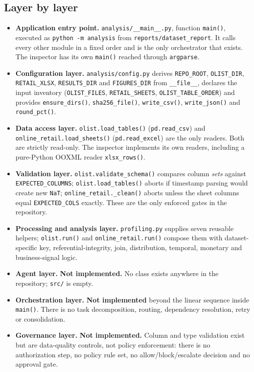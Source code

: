 \documentclass[11pt,a4paper]{article}
\newcommand{\code}[1]{\texttt{#1}}
\begin{document}
\subsection{Layer by layer}
\begin{itemize}
\item \textbf{Application entry point.} \code{analysis/\_\_main\_\_.py}, function \code{main()}, executed as \code{python -m analysis} from \code{reports/dataset\_report}. It calls every other module in a fixed order and is the only orchestrator that exists. The inspector has its own \code{main()} reached through \code{argparse}.
\item \textbf{Configuration layer.} \code{analysis/config.py} derives \code{REPO\_ROOT}, \code{OLIST\_DIR}, \code{RETAIL\_XLSX}, \code{RESULTS\_DIR} and \code{FIGURES\_DIR} from \code{\_\_file\_\_}, declares the input inventory (\code{OLIST\_FILES}, \code{RETAIL\_SHEETS}, \code{OLIST\_TABLE\_ORDER}) and provides \code{ensure\_dirs()}, \code{sha256\_file()}, \code{write\_csv()}, \code{write\_json()} and \code{round\_pct()}.
\item \textbf{Data access layer.} \code{olist.load\_tables()} (\code{pd.read\_csv}) and \code{online\_retail.load\_sheets()} (\code{pd.read\_excel}) are the only readers. Both are strictly read-only. The inspector implements its own readers, including a pure-Python OOXML reader \code{xlsx\_rows()}.
\item \textbf{Validation layer.} \code{olist.validate\_schema()} compares column \emph{sets} against \code{EXPECTED\_COLUMNS}; \code{olist.load\_tables()} aborts if timestamp parsing would create new \code{NaT}; \code{online\_retail.\_clean()} aborts unless the sheet columns equal \code{EXPECTED\_COLS} exactly. These are the only enforced gates in the repository.
\item \textbf{Processing and analysis layer.} \code{profiling.py} supplies seven reusable helpers; \code{olist.run()} and \code{online\_retail.run()} compose them with dataset-specific key, referential-integrity, join, distribution, temporal, monetary and business-signal logic.
\item \textbf{Agent layer.} \textbf{Not implemented.} No class exists anywhere in the repository; \code{src/} is empty.
\item \textbf{Orchestration layer.} \textbf{Not implemented} beyond the linear sequence inside \code{main()}. There is no task decomposition, routing, dependency resolution, retry or consolidation.
\item \textbf{Governance layer.} \textbf{Not implemented.} Column and type validation exist but are data-quality controls, not policy enforcement: there is no authorization step, no policy rule set, no allow/block/escalate decision and no approval gate.

\end{itemize}
\end{document}
